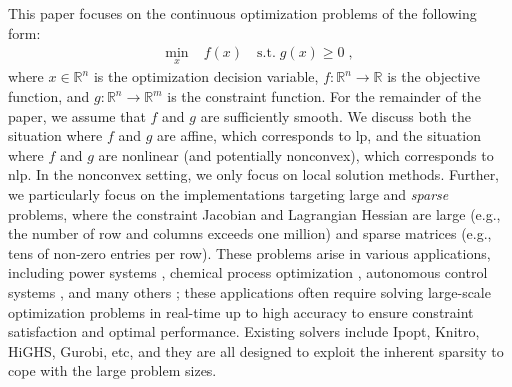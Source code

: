 \documentclass{article}
\begin{document}
This paper focuses on the continuous optimization problems of the following form:
\begin{align}\label{eqn:opt}
  \min_{x } \; & f(x) \quad \text{s.t.} \; g(x) \geq 0 \; ,
\end{align}
where $x \in \mathbb{R}^n$ is the optimization decision variable, $f: \mathbb{R}^n \to \mathbb{R}$ is the objective function, and $g: \mathbb{R}^n \to \mathbb{R}^m$ is the constraint function.
For the remainder of the paper, we assume that $f$ and $g$ are sufficiently smooth.
We discuss both the situation where $f$ and $g$ are affine, which corresponds to \gls{lp}, and the situation where $f$ and $g$ are nonlinear (and potentially nonconvex), which corresponds to \gls{nlp}. In the nonconvex setting, we only focus on local solution methods.
Further, we particularly focus on the implementations targeting large and \emph{sparse} problems, where the constraint Jacobian and Lagrangian Hessian are large (e.g., the number of row and columns exceeds one million) and sparse matrices (e.g., tens of non-zero entries per row).
These problems arise in various applications, including power systems \cite{}, chemical process optimization \cite{}, autonomous control systems \cite{}, and many others \cite{}; these applications often require solving large-scale optimization problems in real-time up to high accuracy to ensure constraint satisfaction and optimal performance.
Existing solvers include Ipopt, Knitro, HiGHS, Gurobi, etc, and they are all designed to exploit the inherent sparsity to cope with the large problem sizes.
\end{document}
